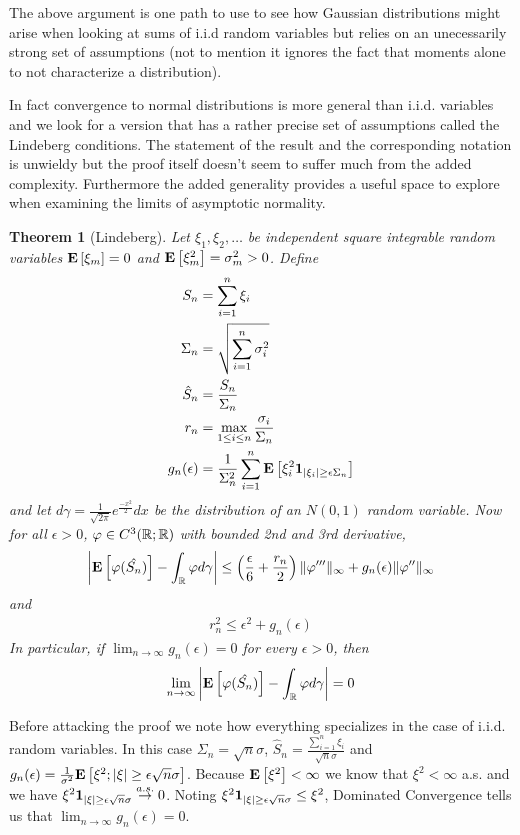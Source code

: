 \documentclass{amsart}
\newtheorem{thm}{Theorem}[section]
\theoremstyle{remark}
\theoremstyle{definition}
\begin{document}
The above argument is one path to use to see how Gaussian
distributions might arise when looking at sums of i.i.d random
variables but relies on an unecessarily strong set of assumptions (not
to mention it ignores the fact that moments alone to not characterize
a distribution).

In fact convergence to normal distributions is more general than
i.i.d. variables and we look for a version that has a rather precise set of
assumptions called the Lindeberg conditions.  The statement of the
result and the corresponding notation is unwieldy but the proof itself
doesn't seem to suffer much from the added complexity.  Furthermore
the added generality provides a useful space to explore when examining the limits of asymptotic normality.

\begin{thm}[Lindeberg]\label{LindebergTheorem}Let $\xi_1, \xi_2, \dots$ be independent square
  integrable random variables $\textbf{E}\left[\xi_m\right] = 0$ and
  $\textbf{E}\left[\xi_m^2\right] = \sigma_m^2 > 0$.  Define
\begin{align*}
S_n &= \sum_{i=1}^n \xi_i \\
\Sigma_n &= \sqrt{\sum_{i=1}^n \sigma_i^2}\\
\hat{S}_n &= \frac{S_n}{\Sigma_n} \\
r_n &= \max_{1 \leq i \leq n} \frac{\sigma_i}{\Sigma_n} \\
g_n(\epsilon) &= \frac{1}{\Sigma_n^2} \sum_{i=1}^n \textbf{E}\left[\xi_i^2
  \textbf{1}_{|\xi_i| \geq \epsilon \Sigma_n}\right]
\end{align*}
and let $d \gamma = \frac{1}{\sqrt{2\pi}} e^{\frac{-x^2}{2}} dx$ be the
  distribution of an $N(0,1)$ random variable.  Now for all $\epsilon > 0$, $\varphi \in C^3(\mathbb{R};\mathbb{R})$ with
bounded 2nd and 3rd derivative,
\begin{align*}
\left \lvert \textbf{E}\left[\varphi(\hat{S_n})\right] - \int_{\mathbb{R}} \varphi
  d\gamma \right \rvert \leq
\left ( \frac{\epsilon}{6} + \frac{r_n}{2}\right ) \lVert \varphi^{\prime\prime\prime} \rVert_\infty + g_n(\epsilon) \lVert \varphi^{ \prime
\prime} \rVert_\infty
\end{align*}
and 
\begin{align*}
r_n^2 \leq \epsilon^2 + g_n(\epsilon)
\end{align*}
In particular, if $\lim_{n \to \infty} g_n(\epsilon) = 0$ for every
$\epsilon > 0$, then 
\begin{align*}
\lim_{n \to \infty} \left \lvert \textbf{E}\left[\varphi(\hat{S_n})\right] - \int_{\mathbb{R}} \varphi
  d\gamma \right \rvert = 0
\end{align*}
\end{thm}
Before attacking the proof we note how everything specializes in the
case of i.i.d. random variables.  In this case $\Sigma_n = \sqrt{n}
\sigma$, $\hat{S}_n = \frac{\sum_{i=1}^n \xi_i}{\sqrt{n} \sigma}$ and
$g_n(\epsilon) = \frac{1}{\sigma^2} \textbf{E}\left[\xi^2 ; \left \vert \xi \right \vert
  \geq \epsilon \sqrt{n} \sigma\right]$.  Because $\textbf{E}\left[\xi^2\right]
< \infty$ we know that $\xi^2 < \infty$ a.s.  and we have
$\xi^2 \textbf{1}_{\left \vert \xi \right \vert  \geq \epsilon \sqrt{n} \sigma}
\overset{a.s.}\to 0$.  Noting $\xi^2 \textbf{1}_{\left \vert \xi \right \vert  \geq \epsilon \sqrt{n}
  \sigma} \leq \xi^2$, Dominated Convergence tells us that $\lim_{n
\to \infty} g_n(\epsilon) = 0$.
\end{document}
